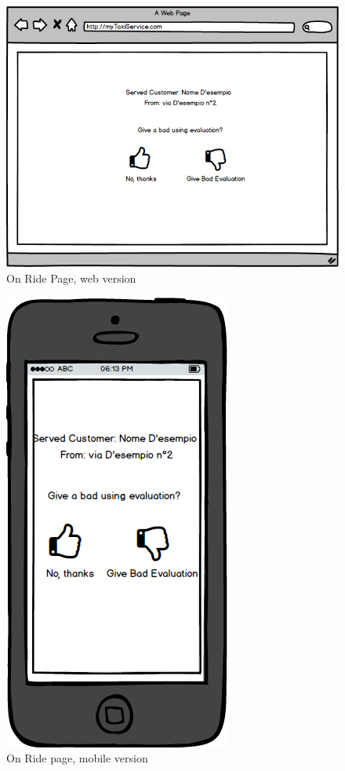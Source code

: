 \documentclass{report}
\begin{document}
				\begin{figure}[H]
					\centering
					\includegraphics[scale=0.5]{IMG/UserInterfaces/onRidePage.png}
					\caption{On Ride Page, web version}\label{tendRidePage_w}
				\end{figure}
				\begin{figure}[H]
					\centering
					\includegraphics[scale=0.4]{IMG/UserInterfaces/onRidePage_m.png}
					\caption{On Ride page, mobile version}\label{tendRidePage_m}
				\end{figure}
				
\end{document}
